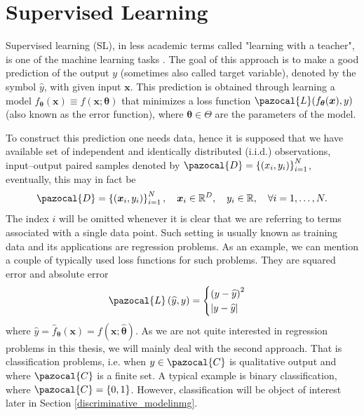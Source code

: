 \section{Supervised Learning}
Supervised learning (SL), in less academic terms called "learning with a teacher", is one of the machine learning tasks  \cite{supervised}.  The goal of this approach is to make a good prediction of the output $y$ (sometimes also called target variable), denoted by the symbol $\hat{y}$, with given input $\boldsymbol{x}$. This prediction is obtained through learning a model $f_{\boldsymbol{\theta}}\left(\boldsymbol{x}\right)\equiv f\left(\boldsymbol{x}; \boldsymbol{\theta}\right)$ that minimizes a loss function  $\pazocal{L}(f_{\boldsymbol{\theta}}(\boldsymbol{x}), y)$ (also known as the error function), where $\boldsymbol{\theta}\in \Theta$ are the parameters of the model. 

To construct this prediction one needs data, hence it is supposed that we have available set of independent and identically distributed (i.i.d.) observations, input--output paired samples denoted by $\pazocal{D} = \left\lbrace \left(x_i , y_i \right)\right\rbrace_{i=1}^N$, eventually, this may in fact be 
\begin{equation}\label{superviseddata}
\pazocal{D} = \left\lbrace\left( \boldsymbol{x}_i , y_i \right)\right\rbrace_{i=1}^N,\quad \boldsymbol{x}_i \in \R^D,\quad y_i \in \R,\quad\forall i = 1,\dots,N.
\end{equation}
The index $i$ will be omitted whenever it is clear
that we are referring to terms associated with a single data point. Such setting is usually known as training data and its applications are regression problems. As an example, we can mention a couple of typically used loss functions for such problems. They are squared error and absolute error
\begin{equation}
\pazocal{L}\left(\widehat{y}, y \right) =
 \begin{cases}
	 \left(y - \widehat{y}\right)^2 \\
	 \abs{y - \widehat{y}} \\
\end{cases}   
\end{equation}
where $\widehat{y} = \widehat{f}_{\boldsymbol{\theta}}\left(\boldsymbol{x}\right) = f(\boldsymbol{x}; \widehat{\boldsymbol{\theta}})$. As we are not quite interested in regression problems in this thesis, we will mainly deal with the second approach. That is classification problems, i.e. when $y \in \pazocal{C}$ is qualitative output and where $\pazocal{C}$ is a finite set.  A typical example is binary classification, where $\pazocal{C} = \left\lbrace0,1 \right\rbrace$. However, classification will be object of interest later in Section \ref{discriminative_modelinmg}.

